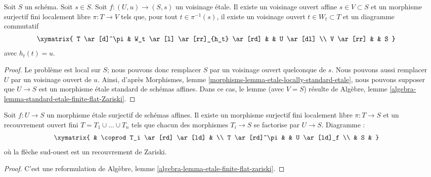 \begin{lemma}
\label{lemma-dominate-etale-neighbourhood-finite-flat}
Soit $S$ un schéma. Soit $s \in S$.
Soit $f : (U, u) \to (S, s)$ un voisinage \'etale.
Il existe un voisinage ouvert affine $s \in V \subset S$
et un morphisme surjectif fini localement libre $\pi : T \to V$
tels que, pour tout $t \in \pi^{-1}(s)$, il existe un
voisinage ouvert $t \in W_t \subset T$ et un
diagramme commutatif
$$
\xymatrix{
T \ar[d]^\pi & W_t \ar[l] \ar[rr]_{h_t} \ar[rd] & & U \ar[dl] \\
V \ar[rr] & & S
}
$$
avec $h_t(t) = u$.
\end{lemma}

\begin{proof}
Le problème est local sur $S$; nous pouvons donc remplacer $S$ par un
voisinage ouvert quelconque de $s$.
Nous pouvons aussi remplacer $U$ par un voisinage ouvert de $u$.
Ainsi, d'après Morphismes, lemme \ref{morphisms-lemma-etale-locally-standard-etale},
nous pouvons supposer que
$U \to S$ est un morphisme \'etale standard de schémas affines.
Dans ce cas, le lemme (avec $V = S$) résulte de
Algèbre, lemme \ref{algebra-lemma-standard-etale-finite-flat-Zariski}.
\end{proof}

\begin{lemma}
\label{lemma-dominate-etale-affine-finite-flat}
Soit $f : U \to S$ un morphisme \'etale surjectif de schémas affines.
Il existe un morphisme surjectif fini localement libre
$\pi : T \to S$ et un recouvrement ouvert fini
$T = T_1 \cup \ldots \cup T_n$ tels que chacun des morphismes
$T_i \to S$ se factorise par $U \to S$. Diagramme :
$$
\xymatrix{
& \coprod T_i  \ar[rd] \ar[ld] & \\
T \ar[rd]^\pi & & U \ar[ld]_f \\
& S &
}
$$
où la flèche sud-ouest est un recouvrement de Zariski.
\end{lemma}

\begin{proof}
C'est une reformulation de
Algèbre, lemme \ref{algebra-lemma-etale-finite-flat-zariski}.
\end{proof}

